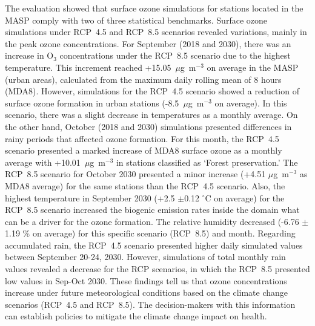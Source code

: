 \begin{spacing}{1.5}
The evaluation showed that surface ozone simulations for stations located in the MASP comply with two of three statistical benchmarks.
Surface ozone simulations under RCP~4.5 and RCP~8.5 scenarios revealed variations, mainly in the peak ozone concentrations.
For September (2018 and 2030), there was an increase in O$_3$ concentrations under the RCP~8.5 scenario due to the highest temperature. This increment reached +15.05~$\mu$g~m$^{-3}$ on average in the MASP (urban areas), calculated from the maximum daily rolling mean of 8 hours (MDA8). However, simulations for the RCP~4.5 scenario showed a reduction of surface ozone formation in urban stations (-8.5~$\mu$g~m$^{-3}$ on average). In this scenario, there was a slight decrease in temperatures as a monthly average.
On the other hand, October (2018 and 2030) simulations presented differences in rainy periods that affected ozone formation. For this month, the RCP~4.5 scenario presented a marked increase of MDA8 surface ozone as a monthly average with +10.01~$\mu$g~m$^{-3}$ in stations classified as `Forest preservation.' The RCP~8.5 scenario for October 2030 presented a minor increase (+4.51 $\mu$g~m$^{-3}$ as MDA8 average) for the same stations than the RCP~4.5 scenario.
Also, the highest temperature in September 2030 (+2.5 $\pm$0.12 $^{\circ}$C on average) for the RCP~8.5 scenario increased the biogenic emission rates inside the domain what can be a driver for the ozone formation.  
The relative humidity decreased (-6.76 $\pm$1.19 \% on average) for this specific scenario (RCP~8.5) and month. Regarding accumulated rain, the RCP~4.5 scenario presented higher daily simulated values between September 20-24, 2030. However, simulations of total monthly rain values revealed a decrease for the RCP scenarios, in which the RCP~8.5 presented low values in Sep-Oct 2030. 
These findings tell us that ozone concentrations increase under future meteorological conditions based on the climate change scenarios (RCP~4.5 and RCP~8.5). The decision-makers with this information can establish policies to mitigate the climate change impact on health.

	\cleardoublepage
	

\end{spacing}
